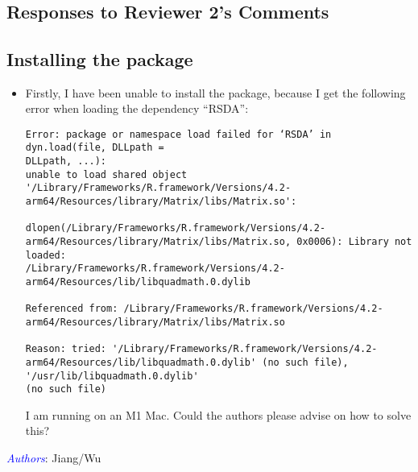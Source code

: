 \documentclass[11pt]{article}
\newcommand{\authors}[1]{

 \parbox{15cm}{\textcolor{blue}{\it Authors}: \color{red}#1}
 \\ \vspace{0.3cm}
}
\begin{document}
\clearpage{} 

 \\

\subsection*{Responses to Reviewer 2's Comments}
\vspace{0.5cm}


\subsection*{Installing the package}
\begin{itemize}
\item[]
Firstly, I have been unable to install the package, because I get the following error when loading the dependency “RSDA”: 
\begin{verbatim}
Error: package or namespace load failed for ‘RSDA’ in dyn.load(file, DLLpath = 
DLLpath, ...): 
unable to load shared object '/Library/Frameworks/R.framework/Versions/4.2-arm64/Resources/library/Matrix/libs/Matrix.so': 

dlopen(/Library/Frameworks/R.framework/Versions/4.2-arm64/Resources/library/Matrix/libs/Matrix.so, 0x0006): Library not loaded: 
/Library/Frameworks/R.framework/Versions/4.2-arm64/Resources/lib/libquadmath.0.dylib 

Referenced from: /Library/Frameworks/R.framework/Versions/4.2-arm64/Resources/library/Matrix/libs/Matrix.so 

Reason: tried: '/Library/Frameworks/R.framework/Versions/4.2-arm64/Resources/lib/libquadmath.0.dylib' (no such file), '/usr/lib/libquadmath.0.dylib' 
(no such file) 
\end{verbatim}
I am running on an M1 Mac. Could the authors please advise on how to solve this? 
\end{itemize}

\authors{Jiang/Wu

}
\end{document}
